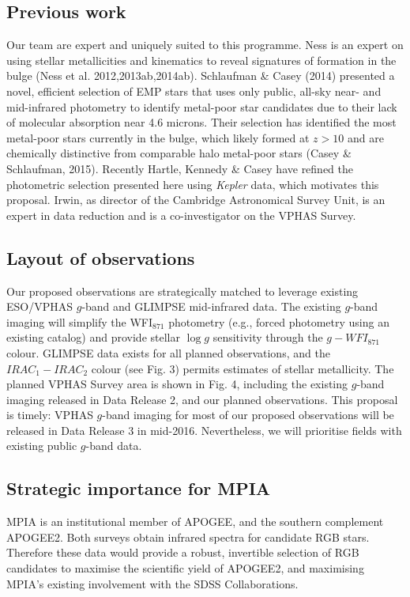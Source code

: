 \documentclass[a4paper]{article}
\begin{document}
\begin{ObservingProgram}
\subsection*{Previous work}
Our team are expert and uniquely suited to this programme.  Ness is an expert on using stellar metallicities and kinematics to reveal signatures of formation in the bulge (Ness et al. 2012,2013ab,2014ab).  Schlaufman \& Casey (2014) presented a novel, efficient selection of EMP stars that uses only public, all-sky near- and mid-infrared photometry to identify metal-poor star candidates due to their lack of molecular absorption near 4.6 microns. Their selection has identified the most metal-poor stars currently in the bulge, which likely formed at $z > 10$ and are chemically distinctive from comparable halo metal-poor stars (Casey \& Schlaufman, 2015). Recently Hartle, Kennedy \& Casey have refined the photometric selection presented here using \textit{Kepler} data, which motivates this proposal. Irwin, as director of the Cambridge Astronomical Survey Unit, is an expert in data reduction and is a co-investigator on the VPHAS Survey.


\subsection*{Layout of observations}
Our proposed observations are strategically matched to leverage existing ESO/VPHAS $g$-band and GLIMPSE mid-infrared data. The existing $g$-band imaging will simplify the WFI$_{871}$ photometry (e.g., forced photometry using an existing catalog) and provide stellar $\log{g}$ sensitivity through the $g-WFI_{871}$ colour. GLIMPSE data exists for all planned observations, and the $IRAC_{1} - IRAC_{2}$ colour (see Fig. 3) permits estimates of stellar metallicity.  The planned VPHAS Survey area is shown in Fig. 4, including the existing $g$-band imaging released in Data Release 2, and our planned observations. This proposal is timely: VPHAS $g$-band imaging for most of our proposed observations will be released in Data Release 3 in mid-2016. Nevertheless, we will prioritise fields with existing public $g$-band data.


\subsection*{Strategic importance for MPIA}
MPIA is an institutional member of APOGEE, and the southern complement APOGEE2. Both surveys obtain infrared spectra for candidate RGB stars. Therefore these data would provide a robust, invertible selection of RGB candidates to maximise the scientific yield of APOGEE2, and maximising MPIA's existing involvement with the SDSS Collaborations.


\end{ObservingProgram}
\end{document}
